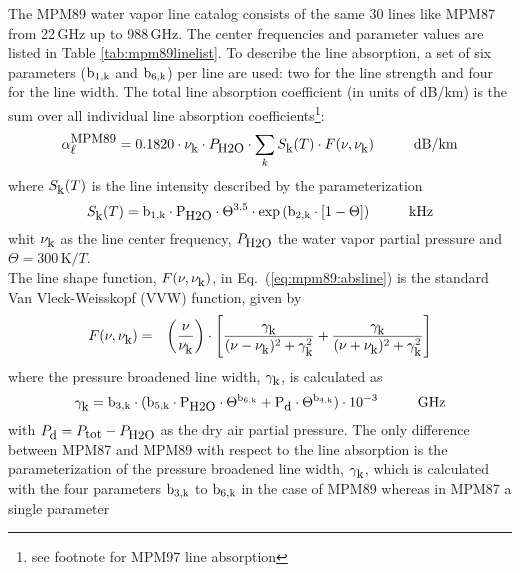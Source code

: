 \label{levele:mpm89_h2olines}
The MPM89 water vapor line catalog consists of the same 30 lines 
like MPM87 from 22\,GHz up to 988\,GHz. The center frequencies and parameter 
values are listed in Table \ref{tab:mpm89linelist}. To describe the line 
absorption, a set of six parameters ($\rm b_{\rm 1,k}$ and $\rm b_{\rm 6,k}$) per line are used: two 
for the line strength and four for the line width. The total line 
absorption coefficient (in units of dB/km) is the sum over all
individual line absorption coefficients\footnote{see footnote for
  MPM97 line absorption}:
\begin{equation}
  \label{eq:mpm89:absline}
  \alphampmml = 0.1820 \cdot \nuk \cdot \phzo \cdot 
  \sum_{k}{\inten \cdot \shape}\hspace*{10mm}\mbox{dB/km}
\end{equation}
where $S_{\mbox{\rm \small k}}(T)$ is the line intensity described by the parameterization
\begin{equation}
  \label{eq:mpm89:strength}
  \inten = \bek \cdot \phzo \cdot \Theta^{3.5} 
           \cdot \exp{(\bzk \cdot [1-\Theta])}\hspace*{10mm}\mbox{kHz}
\end{equation}
whit $\nu_{\mbox{\rm \small k}}$ as the line center frequency, $P_{\mbox{\rm \small H2O}}$ the water
vapor partial pressure and $\Theta = 300\,\mbox{K}/T$.\\
The line shape function, $F(\nu,\nu_{\mbox{\rm \small k}})$, in Eq.~(\ref{eq:mpm89:absline}) 
is the standard Van Vleck-Weisskopf (VVW) function, given by 
\begin{eqnarray}
  \label{eq:mpm89:VVW}
  F(\nu,\nu_{\mbox{\rm \small k}}) & = & \left(\frac{\nu}{\nu_{\mbox{\rm \small k}}}\right) \cdot 
               \left[\frac{\gamma_{\mbox{\rm \small k}}}{(\nu - \nu_{\mbox{\rm \small k}})^2 + \gamma_{\mbox{\rm \small k}}^2} + 
                     \frac{\gamma_{\mbox{\rm \small k}}}{(\nu + \nu_{\mbox{\rm \small k}})^2 + \gamma_{\mbox{\rm \small k}}^2}\right]
\end{eqnarray}
where the pressure broadened line width, $\gamma_{\mbox{\rm \small k}}$, is calculated as
\begin{equation}
  \label{eq:mpm89:gamma}
  \gamk = \bdk \cdot 
         (\bfk \cdot \phzo \cdot \Theta^{\bsk} + 
                     \pda  \cdot \Theta^{\bvk})
        \cdot 10^{-3}\hspace*{10mm}\mbox{GHz}
\end{equation}
with $P_{\mbox{\rm \small d}}=P_{\mbox{\rm \small tot}}-P_{\mbox{\rm \small H2O}}$ as the dry air partial pressure. 
The only difference between MPM87 and MPM89 with respect to the line 
absorption is the parameterization of the pressure broadened line
width, $\gamma_{\mbox{\rm \small k}}$, which is calculated with the four parameters $\rm b_{\rm 3,k}$ to
$\rm b_{\rm 6,k}$ in the case of MPM89 whereas in MPM87 a single parameter

